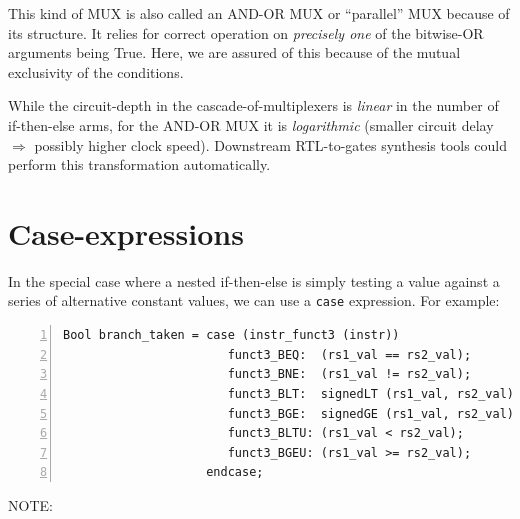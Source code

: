 This kind of MUX is also called an AND-OR MUX or ``parallel'' MUX
because of its structure.  It relies for correct operation on
\emph{precisely one} of the bitwise-OR arguments being True.  Here, we
are assured of this because of the mutual exclusivity of the
conditions.

While the circuit-depth in the cascade-of-multiplexers is
\emph{linear} in the number of if-then-else arms, for the AND-OR MUX
it is \emph{logarithmic} (smaller circuit delay $\Longrightarrow$
possibly higher clock speed).  Downstream RTL-to-gates synthesis tools
could perform this transformation automatically.


\section{Case-expressions}

\label{BSV_case_expressions}


In the special case where a nested if-then-else is simply testing a
value against a series of alternative constant values, we can use a
\verb|case| expression.  For example:

{\footnotesize
\begin{Verbatim}[frame=single, numbers=left, label=from src\_Common/Fn\_EX\_Control.bsv]
Bool branch_taken = case (instr_funct3 (instr))
                       funct3_BEQ:  (rs1_val == rs2_val);
                       funct3_BNE:  (rs1_val != rs2_val);
                       funct3_BLT:  signedLT (rs1_val, rs2_val);
                       funct3_BGE:  signedGE (rs1_val, rs2_val);
                       funct3_BLTU: (rs1_val < rs2_val);
                       funct3_BGEU: (rs1_val >= rs2_val);
                    endcase;
\end{Verbatim}
}


\vspace{1ex}

NOTE: 

